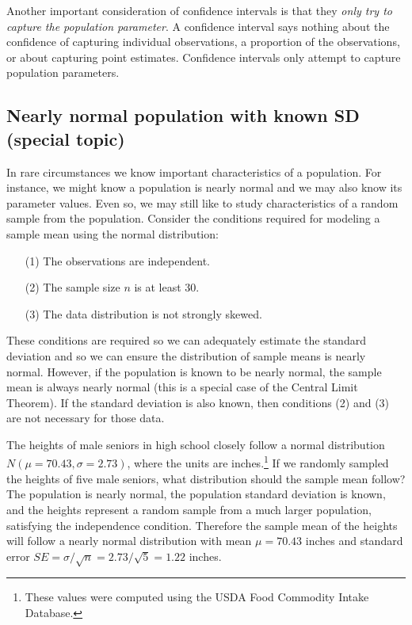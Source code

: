 Another important consideration of confidence intervals is that they \emph{only try to capture the population parameter}. A confidence interval says nothing about the confidence of capturing individual observations, a proportion of the observations, or about capturing point estimates. Confidence intervals only attempt to capture population parameters.


\subsection[Nearly normal population with known SD (special topic)]{Nearly normal population with known SD (special topic)}
\label{nearlyNormalPopWithKnownSD}



In rare circumstances we know important characteristics of a population. For instance, we might know a population is nearly normal and we may also know its parameter values. Even so, we may still like to study characteristics of a random sample from the population. Consider the conditions required for modeling a sample mean using the normal distribution:
\begin{enumerate}
\setlength{\itemsep}{0mm}
\item[(1)] The observations are independent.
\item[(2)] The sample size $n$ is at least 30.
\item[(3)] The data distribution is not strongly skewed.
\end{enumerate}
These conditions are required so we can adequately estimate the standard deviation and so we can ensure the distribution of sample means is nearly normal. However, if the population is known to be nearly normal, the sample mean is always nearly normal (this is a special case of the Central Limit Theorem). If the standard deviation is also known, then conditions (2) and (3) are not necessary for those data.

\begin{example}{The heights of male seniors in high school closely follow a normal distribution $N(\mu=70.43, \sigma=2.73)$, where the units are inches.\footnote{These values were computed using the USDA Food Commodity Intake Database.} If we randomly sampled the heights of five male seniors, what distribution should the sample mean follow?}\label{simpleSampleOfFiveMaleSeniors}
The population is nearly normal, the population standard deviation is known, and the heights represent a random sample from a much larger population, satisfying the independence condition. Therefore the sample mean of the heights will follow a nearly normal distribution with mean $\mu=70.43$ inches and standard error $SE=\sigma/\sqrt{n} = 2.73/\sqrt{5}=1.22$ inches.
\end{example}

